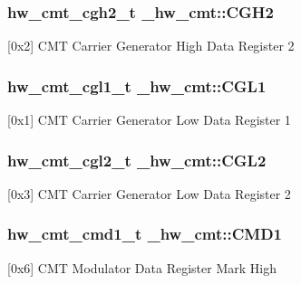 \subsubsection[{\texorpdfstring{C\+G\+H2}{CGH2}}]{ {\bf hw\+\_\+cmt\+\_\+cgh2\+\_\+t} \+\_\+hw\+\_\+cmt\+::\+C\+G\+H2}\hypertarget{struct__hw__cmt_abcc1e9617a66a0a4bbc7bfc4105250fd}{}\label{struct__hw__cmt_abcc1e9617a66a0a4bbc7bfc4105250fd}
\mbox{[}0x2\mbox{]} C\+MT Carrier Generator High Data Register 2 
\subsubsection[{\texorpdfstring{C\+G\+L1}{CGL1}}]{ {\bf hw\+\_\+cmt\+\_\+cgl1\+\_\+t} \+\_\+hw\+\_\+cmt\+::\+C\+G\+L1}\hypertarget{struct__hw__cmt_ae95814a0fc234636cf9730648e6e3d96}{}\label{struct__hw__cmt_ae95814a0fc234636cf9730648e6e3d96}
\mbox{[}0x1\mbox{]} C\+MT Carrier Generator Low Data Register 1 
\subsubsection[{\texorpdfstring{C\+G\+L2}{CGL2}}]{ {\bf hw\+\_\+cmt\+\_\+cgl2\+\_\+t} \+\_\+hw\+\_\+cmt\+::\+C\+G\+L2}\hypertarget{struct__hw__cmt_af2e14c5f848ccb0f424d64a14a68c4c8}{}\label{struct__hw__cmt_af2e14c5f848ccb0f424d64a14a68c4c8}
\mbox{[}0x3\mbox{]} C\+MT Carrier Generator Low Data Register 2 
\subsubsection[{\texorpdfstring{C\+M\+D1}{CMD1}}]{ {\bf hw\+\_\+cmt\+\_\+cmd1\+\_\+t} \+\_\+hw\+\_\+cmt\+::\+C\+M\+D1}\hypertarget{struct__hw__cmt_a579702b8e9eb5f4a1b57652f296267f4}{}\label{struct__hw__cmt_a579702b8e9eb5f4a1b57652f296267f4}
\mbox{[}0x6\mbox{]} C\+MT Modulator Data Register Mark High 
